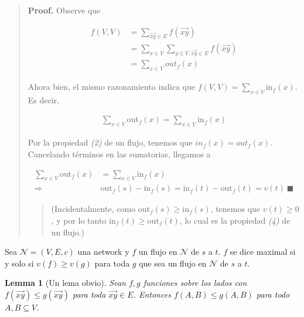 \documentclass[a4paper, 12pt]{article}
\newtheorem{lemma}{Lemma}
\newtheorem{lemma}{Lemma}
\begin{document}
\small
\begin{quote}

    \textbf{Proof.} Observe que 

    \begin{align*}
        f(V, V) &= \sum_{\overrightarrow{xy} \in E} f(\overrightarrow{xy}) \\ 
                &= \sum_{x \in V} \sum_{y \in V, \overrightarrow{xy} \in E} f(\overrightarrow{xy}) \\ 
                &= \sum_{x \in V} out_f(x)
    \end{align*}

    Ahora bien, el mismo razonamiento indica que $f(V, V) = \sum_{x \in V}
    \text{in}_f(x)$. Es decir, 

    \begin{align*}
        \sum_{x \in V} \text{out}_f(x) = \sum_{x \in V} \text{in}_f(x)
    \end{align*}

    Por la propiedad \textit{(2)} de un flujo, tenemos que $in_f(x) = out_f(x)$.
    Cancelando términos en las sumatorias, llegamos a 

    \begin{align*}
        \sum_{x \in V} \text{out}_f(x) &= \sum_{x \in V} \text{in}_f(x) \\ 
        \Rightarrow ~& \text{out}_f(s) - \text{in}_f(s) = \text{in}_f(t) -
        \text{out}_f(t) = v(t) ~ \blacksquare
    \end{align*}
    
    \begin{quote}
        (Incidentalmente, como $\text{out}_f(s) \geq \text{in}_f(s)$, tenemos que
        $v(t) \geq 0$, y por lo tanto $\text{in}_f(t) \geq \text{out}_f(t)$, lo
        cual es la propiedad \textit{(4)} de un flujo.)
    \end{quote}

\end{quote}
\normalsize

\begin{definition}
    Sea $\mathcal{N} = (V, E, c)$ una network y $f$ un flujo en $\mathcal{N}$ de
    $s$ a $t$.
    $f$ se dice maximal si y solo si $v(f) \geq v(g)$ para toda $g$ que sea un
    flujo en $\mathcal{N}$ de $s$ a $t$.
\end{definition}


\begin{lemma}[Un lema obvio]
    Sean $f, g$ funciones sobre los lados con $f(\overrightarrow{xy}) \leq g(\overrightarrow{xy})$
    para toda $\overrightarrow{xy} \in E$. Entonces $f(A, B) \leq g(A, B)$ para todo $A, B
    \subseteq V$.
\end{lemma}
\end{document}
